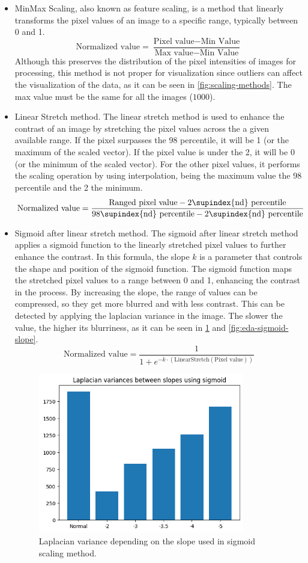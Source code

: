 \begin{itemize}
	\item MinMax Scaling, also known as feature scaling, is a method that linearly transforms the pixel values of an image to a specific range, typically between 0 and 1. 
	\[\text{Normalized value} = \frac{\text{Pixel value} - \text{Min Value}}{\text{Max value} - \text{Min Value}}\]
	Although this preserves the distribution of the pixel intensities of images for processing, this method is not proper for visualization since outliers can affect the visualization of the data, as it can be seen in \ref{fig:scaling-methods}. The max value must be the same for all the images ($1000$).
	\item Linear Stretch method. The linear stretch method is used to enhance the contrast of an image by stretching the pixel values across the a given available range.  If the pixel surpasses the 98 percentile, it will be 1 (or the maximum of the scaled vector). If the pixel value is under the 2, it will be 0 (or the minimum of the scaled vector). For the other pixel values, it performs the scaling operation by using interpolation, being the maximum value the 98 percentile and the 2 the minimum.
	\[\text{Normalized value} = \frac{\text{Ranged pixel value} - \text{2\supindex{nd} percentile}}{\text{98\supindex{nd} percentile} - \text{2\supindex{nd} percentile}}\]
	\item Sigmoid after linear stretch method. The sigmoid after linear stretch method applies a sigmoid function to the linearly stretched pixel values to further enhance the contrast. In this formula, the slope $k$ is a parameter that controls the shape and position of the sigmoid function. The sigmoid function maps the stretched pixel values to a range between 0 and 1, enhancing the contrast in the process. By increasing the slope, the range of values can be compressed, so they get more blurred and with less contrast. This can be detected by applying the laplacian variance in the image. The slower the value, the higher its blurriness, as it can be seen in  \ref{fig:eda-laplacian-vars-slope} and \ref{fig:eda-sigmoid-slope}.
	\[\text{Normalized value} = \frac{1}{1 + e^{-k \cdot(\text{LinearStretch}(\text{Pixel value}))}}\]
	\begin{figure}[H]
		\centering
		\includegraphics[width=9cm]{imgs/eda/sigmoid-slope-2}
		\caption{Laplacian variance depending on the slope used in sigmoid scaling method.}
		\label{fig:eda-laplacian-vars-slope}
	\end{figure}
\end{itemize}
